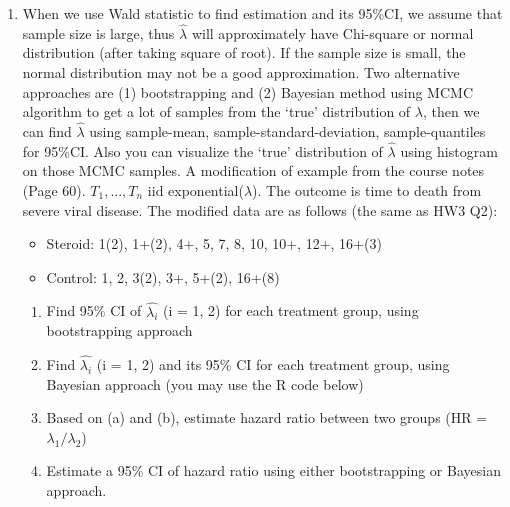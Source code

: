 \begin{enumerate}




\item When we use Wald statistic to find estimation and its 95\%CI, we assume that sample size is large, thus $\hat{\lambda}$ will approximately have Chi-square or normal distribution (after taking square of root). If the sample size is small, the normal distribution may not be a good approximation. Two alternative approaches are (1) bootstrapping and (2) Bayesian method using MCMC algorithm to get a lot of samples from the ‘true’ distribution of $\lambda$, then we can find $\hat{\lambda}$ using sample-mean, sample-standard-deviation, sample-quantiles for 95\%CI. Also you can visualize the ‘true’ distribution of $\hat{\lambda}$ using histogram on those MCMC samples. A modification of example from the course notes (Page 60). $T_1,...,T_n$ iid exponential($\lambda$). The outcome is time to death from severe viral disease. The modified data are as follows (the same as HW3 Q2):
\begin{itemize}
\item Steroid: 1(2), 1+(2), 4+, 5, 7, 8, 10, 10+, 12+, 16+(3)
\item Control: 1, 2, 3(2), 3+, 5+(2), 16+(8)
\end{itemize}

\begin{enumerate}
\item Find 95\% CI of $\hat{\lambda_i}$ (i = 1, 2) for each treatment group, using bootstrapping approach

\item Find $\hat{\lambda_i}$ (i = 1, 2) and its 95\% CI for each treatment group, using Bayesian approach (you may use the R code below)

\item Based on (a) and (b), estimate hazard ratio between two groups (HR = $\lambda_1/\lambda_2$) 
\item Estimate a 95\% CI of hazard ratio using either bootstrapping or Bayesian approach.
\end{enumerate}

\end{enumerate}

